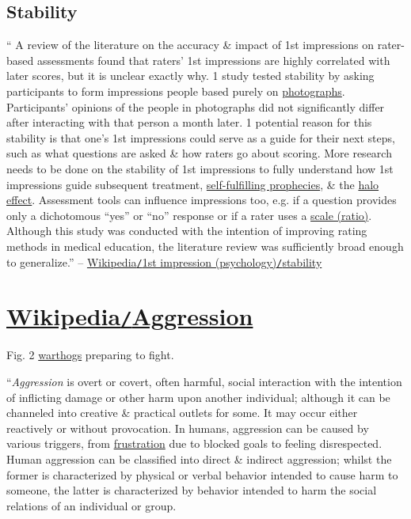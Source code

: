 \documentclass[oneside]{book}
\numberwithin{equation}{section}
\begin{document}
\subsection{Stability}
`` A review of the literature on the accuracy \& impact of 1st impressions on rater-based assessments found that raters' 1st impressions are highly correlated with later scores, but it is unclear exactly why. 1 study tested stability by asking participants to form impressions people based purely on \href{https://en.wikipedia.org/wiki/Photographs}{photographs}. Participants' opinions of the people in photographs did not significantly differ after interacting with that person a month later. 1 potential reason for this stability is that one's 1st impressions could serve as a guide for their next steps, such as what questions are asked \& how raters go about scoring. More research needs to be done on the stability of 1st impressions to fully understand how 1st impressions guide subsequent treatment, \href{https://en.wikipedia.org/wiki/Self-fulfilling_prophecies}{self-fulfilling prophecies}, \& the \href{https://en.wikipedia.org/wiki/Halo_effect}{halo effect}. Assessment tools can influence impressions too, e.g. if a question provides only a dichotomous ``yes'' or ``no'' response or if a rater uses a \href{https://en.wikipedia.org/wiki/Scale_(ratio)}{scale (ratio)}. Although this study was conducted with the intention of improving rating methods in medical education, the literature review was sufficiently broad enough to generalize.'' -- \href{https://en.wikipedia.org/wiki/First_impression_(psychology)#Stability}{Wikipedia\texttt{/}1st impression (psychology)\texttt{/}stability}


\section{\href{https://en.wikipedia.org/wiki/Aggression}{Wikipedia\texttt{/}Aggression}}
\textsf{Fig. 2 \href{https://en.wikipedia.org/wiki/Warthog}{warthogs} preparing to fight.}

``\textit{Aggression} is overt or covert, often harmful, social interaction with the intention of inflicting damage or other harm upon another individual; although it can be channeled into creative \& practical outlets for some. It may occur either reactively or without provocation. In humans, aggression can be caused by various triggers, from \href{https://en.wikipedia.org/wiki/Frustration}{frustration} due to blocked goals to feeling disrespected. Human aggression can be classified into direct \& indirect aggression; whilst the former is characterized by physical or verbal behavior intended to cause harm to someone, the latter is characterized by behavior intended to harm the social relations of an individual or group.
\end{document}

